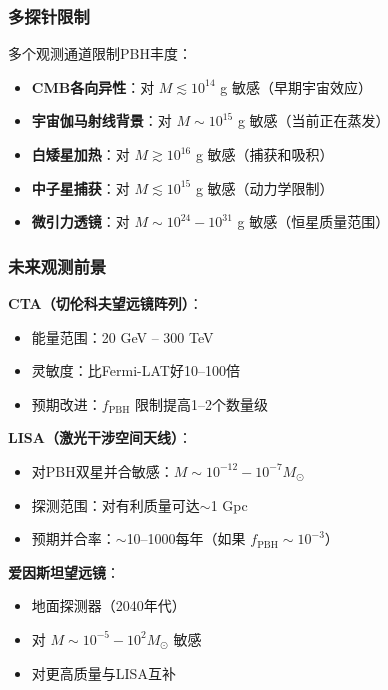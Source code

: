 \subsubsection{多探针限制}

多个观测通道限制PBH丰度：

\begin{itemize}
    \item \textbf{CMB各向异性}：对 $M \lesssim 10^{14}$ g 敏感（早期宇宙效应）
    \item \textbf{宇宙伽马射线背景}：对 $M \sim 10^{15}$ g 敏感（当前正在蒸发）
    \item \textbf{白矮星加热}：对 $M \gtrsim 10^{16}$ g 敏感（捕获和吸积）
    \item \textbf{中子星捕获}：对 $M \lesssim 10^{15}$ g 敏感（动力学限制）
    \item \textbf{微引力透镜}：对 $M \sim 10^{24}-10^{31}$ g 敏感（恒星质量范围）
\end{itemize}

\subsubsection{未来观测前景}

\textbf{CTA（切伦科夫望远镜阵列）}：
\begin{itemize}
    \item 能量范围：20 GeV -- 300 TeV
    \item 灵敏度：比Fermi-LAT好10--100倍
    \item 预期改进：$f_{\text{PBH}}$ 限制提高1--2个数量级
\end{itemize}

\textbf{LISA（激光干涉空间天线）}：
\begin{itemize}
    \item 对PBH双星并合敏感：$M \sim 10^{-12} - 10^{-7} M_\odot$
    \item 探测范围：对有利质量可达$\sim$1 Gpc
    \item 预期并合率：$\sim$10--1000每年（如果 $f_{\text{PBH}} \sim 10^{-3}$）
\end{itemize}

\textbf{爱因斯坦望远镜}：
\begin{itemize}
    \item 地面探测器（2040年代）
    \item 对 $M \sim 10^{-5} - 10^{2} M_\odot$ 敏感
    \item 对更高质量与LISA互补
\end{itemize}


